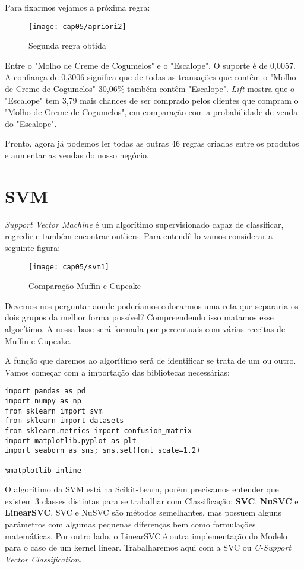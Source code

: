 Para fixarmos vejamos a próxima regra:
\begin{figure}[H]
	\centering
	\texttt{[image: cap05/apriori2]}
	\caption{Segunda regra obtida}
\end{figure}

Entre o "Molho de Creme de Cogumelos" e o "Escalope". O suporte é de 0,0057. A confiança de 0,3006 significa que de todas as transações que contêm o "Molho de Creme de Cogumelos" 30,06\% também contêm "Escalope". \textit{Lift} mostra que o "Escalope" tem 3,79 mais chances de ser comprado pelos clientes que compram o "Molho de Creme de Cogumelos", em comparação com a probabilidade de venda do "Escalope".

Pronto, agora já podemos ler todas as outras 46 regras criadas entre os produtos e aumentar as vendas do nosso negócio.

\section{SVM}
\textit{Support Vector Machine} é um algorítimo supervisionado capaz de classificar, regredir e também encontrar outliers. Para entendê-lo vamos considerar a seguinte figura:
\begin{figure}[H]
	\centering
	\texttt{[image: cap05/svm1]}
	\caption{Comparação Muffin e Cupcake}
\end{figure}

Devemos nos perguntar aonde poderíamos colocarmos uma reta que separaria os dois grupos da melhor forma possível? Compreendendo isso matamos esse algorítimo. A nossa base será formada por percentuais com várias receitas de Muffin e Cupcake.

A função que daremos ao algorítimo será de identificar se trata de um ou outro. Vamos começar com a importação das bibliotecas necessárias:
\begin{lstlisting}[]
import pandas as pd
import numpy as np
from sklearn import svm
from sklearn import datasets
from sklearn.metrics import confusion_matrix
import matplotlib.pyplot as plt
import seaborn as sns; sns.set(font_scale=1.2)

%matplotlib inline
\end{lstlisting}

O algorítimo da SVM está na Scikit-Learn, porém precisamos entender que existem 3 classes distintas para se trabalhar com Classificação: \textbf{SVC}, \textbf{NuSVC} e \textbf{LinearSVC}. SVC e NuSVC são métodos semelhantes, mas possuem alguns parâmetros com algumas pequenas diferenças bem como formulações matemáticas. Por outro lado, o LinearSVC é outra implementação do Modelo para o caso de um kernel linear. Trabalharemos aqui com a SVC ou \textit{C-Support Vector Classification}.

